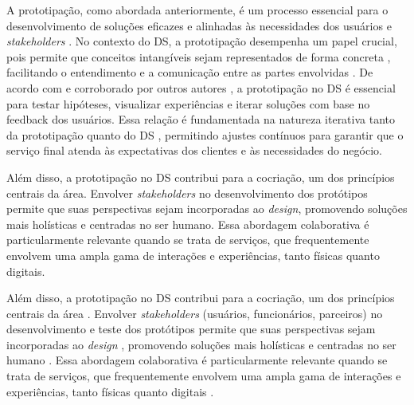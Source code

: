 A prototipação, como abordada anteriormente, é um processo essencial para o desenvolvimento de soluções eficazes e alinhadas às necessidades dos usuários e \textit{stakeholders} \cite{Blomkvist2014, paust2025integrative}. No contexto do DS, a prototipação desempenha um papel crucial, pois permite que conceitos intangíveis sejam representados de forma concreta \cite{Stickdorn2019, mager2023product, soto2023prototyping}, facilitando o entendimento e a comunicação entre as partes envolvidas \cite{Blomkvist2014, paust2025integrative, wang2023smartproducts}. De acordo com  e corroborado por outros autores \cite{paust2025integrative, asbjornsen2022echange, kumar2023rheumatology}, a prototipação no DS é essencial para testar hipóteses, visualizar experiências e iterar soluções com base no feedback dos usuários. Essa relação é fundamentada na natureza iterativa tanto da prototipação quanto do DS \cite{Stickdorn2019, kumar2023rheumatology, paust2025integrative}, permitindo ajustes contínuos para garantir que o serviço final atenda às expectativas dos clientes e às necessidades do negócio.


Além disso, a prototipação no DS contribui para a cocriação, um dos princípios centrais da área. Envolver \textit{stakeholders} no desenvolvimento dos protótipos permite que suas perspectivas sejam incorporadas ao \textit{design}, promovendo soluções mais holísticas e centradas no ser humano. Essa abordagem colaborativa é particularmente relevante quando se trata de serviços, que frequentemente envolvem uma ampla gama de interações e experiências, tanto físicas quanto digitais.

Além disso, a prototipação no DS contribui para a cocriação, um dos princípios centrais da área \cite{Stickdorn2019}. Envolver \textit{stakeholders} (usuários, funcionários, parceiros) no desenvolvimento e teste dos protótipos permite que suas perspectivas sejam incorporadas ao \textit{design} \cite{asbjornsen2022echange, kumar2023rheumatology, milton2021eatingdisorders}, promovendo soluções mais holísticas e centradas no ser humano \cite{mager2023product}. Essa abordagem colaborativa é particularmente relevante quando se trata de serviços, que frequentemente envolvem uma ampla gama de interações e experiências, tanto físicas quanto digitais \cite{quintero2021interdisciplinary, seko2024transitions}.


